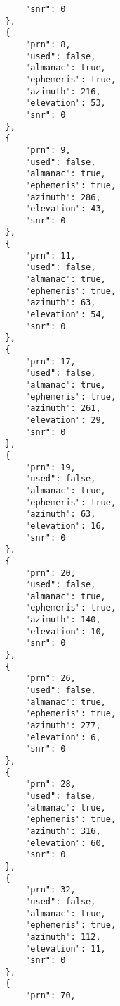 \begin{verbatim}
                    "snr": 0
                },
                {
                    "prn": 8,
                    "used": false,
                    "almanac": true,
                    "ephemeris": true,
                    "azimuth": 216,
                    "elevation": 53,
                    "snr": 0
                },
                {
                    "prn": 9,
                    "used": false,
                    "almanac": true,
                    "ephemeris": true,
                    "azimuth": 286,
                    "elevation": 43,
                    "snr": 0
                },
                {
                    "prn": 11,
                    "used": false,
                    "almanac": true,
                    "ephemeris": true,
                    "azimuth": 63,
                    "elevation": 54,
                    "snr": 0
                },
                {
                    "prn": 17,
                    "used": false,
                    "almanac": true,
                    "ephemeris": true,
                    "azimuth": 261,
                    "elevation": 29,
                    "snr": 0
                },
                {
                    "prn": 19,
                    "used": false,
                    "almanac": true,
                    "ephemeris": true,
                    "azimuth": 63,
                    "elevation": 16,
                    "snr": 0
                },
                {
                    "prn": 20,
                    "used": false,
                    "almanac": true,
                    "ephemeris": true,
                    "azimuth": 140,
                    "elevation": 10,
                    "snr": 0
                },
                {
                    "prn": 26,
                    "used": false,
                    "almanac": true,
                    "ephemeris": true,
                    "azimuth": 277,
                    "elevation": 6,
                    "snr": 0
                },
                {
                    "prn": 28,
                    "used": false,
                    "almanac": true,
                    "ephemeris": true,
                    "azimuth": 316,
                    "elevation": 60,
                    "snr": 0
                },
                {
                    "prn": 32,
                    "used": false,
                    "almanac": true,
                    "ephemeris": true,
                    "azimuth": 112,
                    "elevation": 11,
                    "snr": 0
                },
                {
                    "prn": 70,

\end{verbatim}
